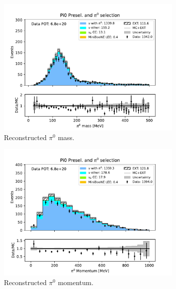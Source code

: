 \begin{figure}[H]
    \centering
    \begin{subfigure}{0.33\linewidth}
        \includegraphics[width=\linewidth]{technote/Sidebands/Figures/TwoShowerSideband/two_shr_sideband_pi0_mass_Y_corr_run123_PI0_PI0.pdf}
        \caption{Reconstructed $\pi^0$ mass.}
    \end{subfigure}%
    \begin{subfigure}{0.33\linewidth}
        \includegraphics[width=\linewidth]{technote/Sidebands/Figures/TwoShowerSideband/two_shr_sideband_pi0momentum_run123_PI0_PI0.pdf}
        \caption{Reconstructed $\pi^0$ momentum.}
    \end{subfigure}%
    \begin{subfigure}{0.33\linewidth}

\end{subfigure}
\end{figure}
